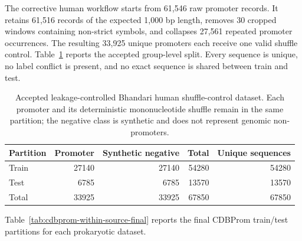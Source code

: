 The corrective human workflow starts from 61,546 raw promoter records. It
retains 61,516 records of the expected 1,000 bp length, removes 30 cropped
windows containing non-strict symbols, and collapses 27,561 repeated promoter
occurrences. The resulting 33,925 unique promoters each receive one valid
shuffle control. Table~\ref{tab:bhandari-leakage-controlled-counts} reports the
accepted group-level split. Every sequence is unique, no label conflict is
present, and no exact sequence is shared between train and test.

\begin{table}[htbp]
\centering
\caption{Accepted leakage-controlled Bhandari human shuffle-control dataset. Each promoter and its deterministic mononucleotide shuffle remain in the same partition; the negative class is synthetic and does not represent genomic non-promoters.}
\label{tab:bhandari-leakage-controlled-counts}
\begin{tabular}{lrrrr}
\hline
Partition & Promoter & Synthetic negative & Total & Unique sequences \\
\hline
Train & 27140 & 27140 & 54280 & 54280 \\
Test & 6785 & 6785 & 13570 & 13570 \\
Total & 33925 & 33925 & 67850 & 67850 \\
\hline
\end{tabular}
\end{table}

Table~\ref{tab:cdbprom-within-source-final} reports the final CDBProm train/test partitions for each prokaryotic dataset.

